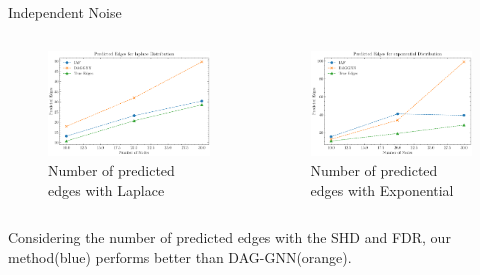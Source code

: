 \documentclass{beamer}
\begin{document}
\begin{frame}[allowframebreaks]{Independent Noise}
    \begin{columns}
        \begin{column}{0.5\textwidth}
            \begin{figure}
                \centering
                \includegraphics[width=\textwidth]{fig/Predicted Edges_independence_laplace.pdf}
                \caption{Number of predicted edges with Laplace}
                \label{fig:ind_laplace_edges}
            \end{figure}
        \end{column}
        \begin{column}{0.5\textwidth}
            \begin{figure}
                \centering
                \includegraphics[width=\textwidth]{fig/Predicted Edges_independence_exponential.pdf}
                \caption{Number of predicted edges with Exponential}
                \label{fig:ind_exponential_edges}
            \end{figure}
        \end{column}
    \end{columns}
    Considering the number of predicted edges with the SHD and FDR, our method(blue) performs better than DAG-GNN(orange).


\end{frame}
\end{document}
